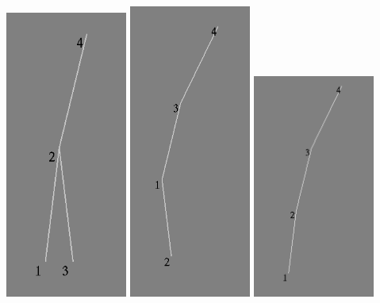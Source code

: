 \documentclass{ltjsarticle}
\begin{document}
\includegraphics[width=4cm]{13.png}
\includegraphics[width=4cm]{14.png}
\includegraphics[width=4cm]{15.png}
\end{document}
